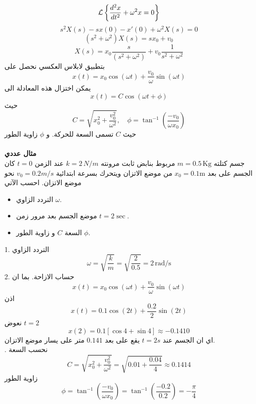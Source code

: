 \[
\mathcal{L}\left\{\frac{d^2 x}{dt^2} + \omega^2 x = 0 \right\}
\]
\[
s^2X(s) - sx(0) - x'(0) + \omega^2 X(s)=0
\]
\[
(s^2 + \omega^2 ) X(s) = sx_0 + v_0 
\]
\[
X(s) = x_0\frac{s}{(s^2 + \omega^2 )} + v_0 \frac{1}{s^2 + \omega^2}
\]
بتطبيق لابلاس العكسي نحصل على 
\[
x(t) = x_0\cos(\omega t) + \frac{v_0}{\omega} \sin(\omega t)
\]
يمكن اختزال هذه المعادلة الى 
\[
x(t) = C \cos(\omega t + \phi)
\]
حيث 
\[
C = \sqrt{x_0^2 + \frac{v_0^2}{\omega^2}}, \quad \phi=\tan^{-1} \left(\frac{-v_0}{\omega x_0}\right)
\]
حيث $C$ تسمى السعة للحركة. و $\phi$ زاوية الطور\\ \\
\noindent
\textbf{مثال عددي}\\
جسم كتلته $m = 0.5 \, \text{Kg}$ مربوط بنابض ثابت مرونته $k = 2\, N/m$ عند الزمن $t=0$ كان الجسم على بعد $x_0=0.1\text{m}$ من موضع الاتزان ويتحرك بسرعة ابتدائية $v_0 = 0.2 m/s$ نحو موضع الاتزان. احسب الآتي
\begin{itemize}
	\item التردد الزاوي $\omega$.
	\item موضع الجسم بعد مرور زمن $t = 2\sec$.
	\item السعة $C$ و زاوية الطور  $\phi$.
\end{itemize}
\begin{solution}
	1. التردد الزاوي
	\[
	\omega = \sqrt{\frac{k}{m}} = \sqrt{\frac{2}{0.5}} = 2 \, \text{rad}/\text{s}
	\]
	2. حساب الازاحة. بما ان 
	\[
	x(t) =  x_0\cos(\omega t) + \frac{v_0}{\omega} \sin(\omega t)
	\]
	اذن
	\[
	x(t) =  0.1\cos(2 t) + \frac{0.2}{2} \sin(2 t)
	\]
	نعوض $t=2$
	\[
	x(2) = 0.1 [\cos 4 + \sin 4] \approx  -0.1410 
	\]
	اي ان الجسم عند $t=2 s$ يقع على بعد $0.141$ متر على يسار موضع الاتزان.\\ 
	. نحسب السعة 
	\[
	C = \sqrt{x_0^2 + \frac{v_0^2}{\omega^2}} = \sqrt{0.01 + \frac{0.04}{4}} \approx 0.1414
	\]
	زاوية الطور
	\[
\phi=\tan^{-1} \left(\frac{-v_0}{\omega x_0}\right) = \tan^{-1} \left(\frac{-0.2}{0.2}\right) = - \frac{\pi}{4}
	\]
\end{solution}
